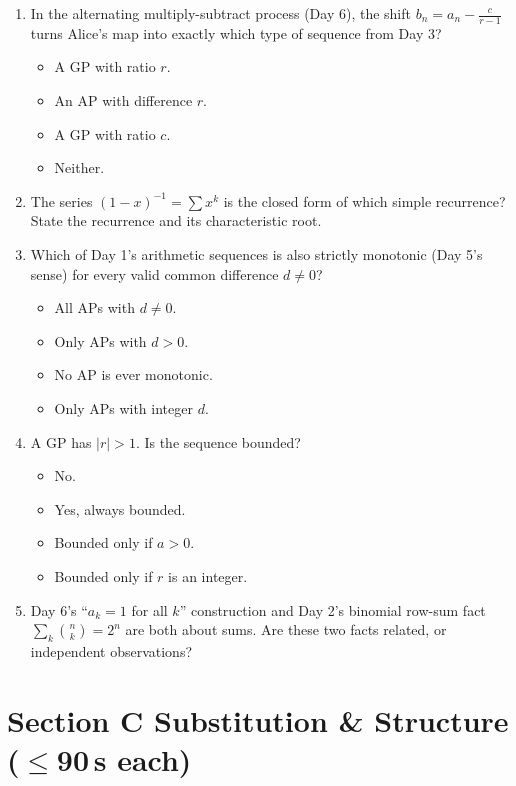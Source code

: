 \documentclass[11pt,a4paper]{article}
\begin{document}
\begin{enumerate}
\item In the alternating multiply-subtract process (Day 6), the shift $b_n=a_n-\frac c{r-1}$ turns Alice's map into exactly which type of sequence from Day 3?
\begin{itemize}
\item[A)] A GP with ratio $r$.
\item[B)] An AP with difference $r$.
\item[C)] A GP with ratio $c$.
\item[D)] Neither.
\end{itemize}

\item The series $(1-x)^{-1}=\sum x^k$ is the closed form of which simple recurrence? State the recurrence and its characteristic root.

\item Which of Day 1's arithmetic sequences is also strictly monotonic (Day 5's sense) for every valid common difference $d\neq0$?
\begin{itemize}
\item[A)] All APs with $d\neq0$.
\item[B)] Only APs with $d>0$.
\item[C)] No AP is ever monotonic.
\item[D)] Only APs with integer $d$.
\end{itemize}

\item A GP has $|r|>1$. Is the sequence bounded?
\begin{itemize}
\item[A)] No.
\item[B)] Yes, always bounded.
\item[C)] Bounded only if $a>0$.
\item[D)] Bounded only if $r$ is an integer.
\end{itemize}

\item Day 6's ``$a_k=1$ for all $k$'' construction and Day 2's binomial row-sum fact $\sum_k\binom nk=2^n$ are both about sums. Are these two facts related, or independent observations?

\end{enumerate}

\section*{Section C \quad Substitution \& Structure \hfill{\normalfont\small($\leq$90\,s each)}}
\end{document}
